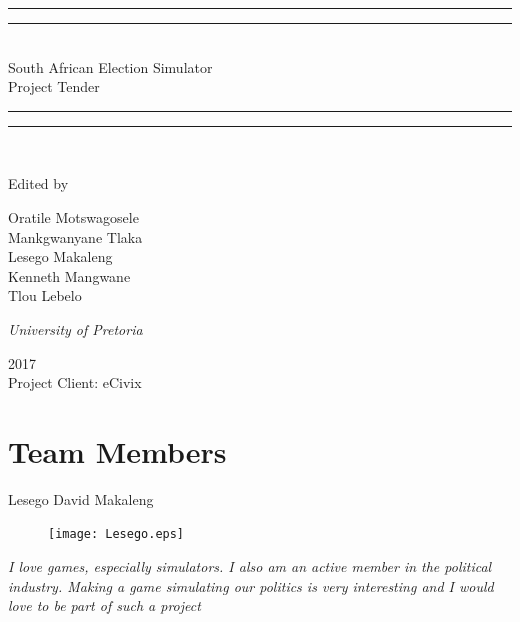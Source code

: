 \documentclass{article}
\newcommand*{\titleGP}{\begingroup %

\centering %
\vspace*{\baselineskip} %

\rule{\textwidth}{1.6pt}\vspace*{-\baselineskip}\vspace*{2pt} %
\rule{\textwidth}{0.4pt}\\[\baselineskip] %

{\LARGE South African Election Simulator \\ Project  Tender}\\[0.2\baselineskip] %

\rule{\textwidth}{0.4pt}\vspace*{-\baselineskip}\vspace{3.2pt} %
\rule{\textwidth}{1.6pt}\\[\baselineskip] %

\scshape %
\vspace*{2\baselineskip} %

Edited by \\[\baselineskip]
{\Large Oratile Motswagosele \\ Mankgwanyane Tlaka \\ Lesego Makaleng \\ Kenneth Mangwane \\ Tlou Lebelo\par} %

{\itshape University of Pretoria\par} %

\vfill %

{\scshape 2017} \\[0.3\baselineskip] %
{ Project Client: eCivix}\par %

\endgroup}
\begin{document}
 

\titleGP %
\pagebreak
\section{Team Members}
\centering
{\huge Lesego David Makaleng}
\begin{figure}[h]
\centering
\texttt{[image: Lesego.eps]} 
\end{figure}

 	\textit{I love games, especially simulators. I also am an active member in the political industry. Making a game simulating our politics is very interesting and I would love to be part of such a project}
\end{document}
